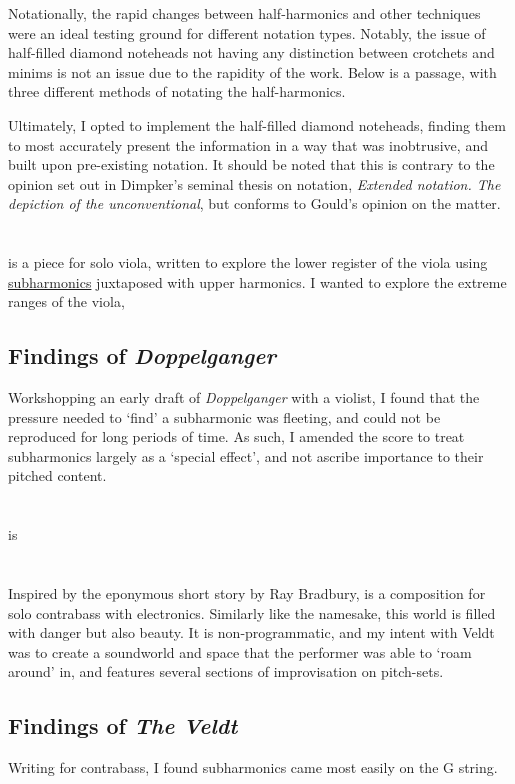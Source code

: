 Notationally, the rapid changes between half-harmonics and other techniques were an ideal testing ground for different notation types. 
Notably, the issue of half-filled diamond noteheads not having any distinction between crotchets and minims is not an issue due to the rapidity of the work.
Below is a passage, with three different methods of notating the half-harmonics.


Ultimately, I opted to implement the half-filled diamond noteheads, finding them to most accurately present the information in a way that was inobtrusive, and built upon pre-existing notation.
It should be noted that this is contrary to the opinion set out in Dimpker's seminal thesis on notation, \emph{Extended notation. The depiction of the
unconventional}, but conforms to Gould's opinion on the matter.\autocites[120-121]{dimpkerExtendedNotationDepiction2012}[61]{gouldBars2011}

\section{\violaPiece} \label{sec:violaPiece}
\violaPiece is a piece for solo viola, written to explore the lower register of the viola using \hyperref[sec:subharmonicsDiscussion]{subharmonics} juxtaposed with upper harmonics. 
I wanted to explore the extreme ranges of the viola,


\subsection{Findings of \emph{Doppelganger}}
Workshopping an early draft of \emph{Doppelganger} with a violist, I found that the pressure needed to `find' a subharmonic was fleeting, and could not be reproduced for long periods of time.
As such, I amended the score to treat subharmonics largely as a `special effect', and not ascribe importance to their pitched content.


\section{\celloPiece} \label{sec:celloPiece}

\celloPiece is \lipsum[1]


\section{\bassPiece} \label{sec:bassPiece}
Inspired by the eponymous short story by Ray Bradbury, \bassPiece  is a composition for solo contrabass with electronics. 
Similarly like the namesake, this world is filled with danger but also beauty. 
It is non-programmatic, and my intent with Veldt was to create a soundworld and space that the performer was able to `roam around' in, and features several sections of improvisation on pitch-sets.

\subsection{Findings of \emph{The Veldt}}
Writing for contrabass, I found subharmonics came most easily on the G string. 
